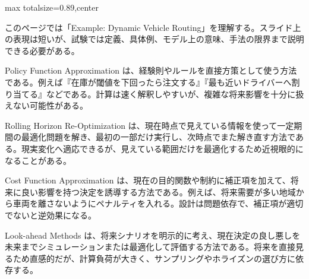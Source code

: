 \begin{minipage}[t]{0.58\textwidth}
\begin{adjustbox}{max totalsize={\textwidth}{0.89\textheight},center}
\begin{minipage}{\textwidth}\scriptsize
{}このページでは「Example: Dynamic Vehicle Routing」を理解する。スライド上の表現は短いが、試験では定義、具体例、モデル上の意味、手法の限界まで説明できる必要がある。\par
Policy Function Approximation は、経験則やルールを直接方策として使う方法である。例えば『在庫が閾値を下回ったら注文する』『最も近いドライバーへ割り当てる』などである。計算は速く解釈しやすいが、複雑な将来影響を十分に扱えない可能性がある。\par
Rolling Horizon Re-Optimization は、現在時点で見えている情報を使って一定期間の最適化問題を解き、最初の一部だけ実行し、次時点でまた解き直す方法である。現実変化へ適応できるが、見えている範囲だけを最適化するため近視眼的になることがある。\par
Cost Function Approximation は、現在の目的関数や制約に補正項を加えて、将来に良い影響を持つ決定を誘導する方法である。例えば、将来需要が多い地域から車両を離さないようにペナルティを入れる。設計は問題依存で、補正項が適切でないと逆効果になる。\par
Look-ahead Methods は、将来シナリオを明示的に考え、現在決定の良し悪しを未来までシミュレーションまたは最適化して評価する方法である。将来を直接見るため直感的だが、計算負荷が大きく、サンプリングやホライズンの選び方に依存する。\par

\end{minipage}
\end{adjustbox}
\end{minipage}
